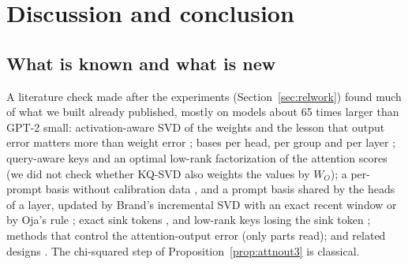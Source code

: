 \documentclass[10pt]{article}
\theoremstyle{plain}
\theoremstyle{definition}
\theoremstyle{remark}
\begin{document}

\section{Discussion and conclusion}
\label{sec:discussion}

\subsection{What is known and what is new}
\label{sec:novelty}

A literature check made after the experiments (Section~\ref{sec:relwork}) found much of what we built already published, mostly on models about 65 times larger than GPT-2 small: activation-aware SVD of the weights and the lesson that output error matters more than weight error \cite{wang2025svdllm,yuan2023asvd,hsu2022}; bases per head, per group and per layer \cite{palu2025}; query-aware keys \cite{attsvd2026,saki2026} and an optimal low-rank factorization of the attention scores \cite{kqsvd2025} (we did not check whether KQ-SVD also weights the values by $W_O$); a per-prompt basis without calibration data \cite{attsvd2026}, and a prompt basis shared by the heads of a layer, updated by Brand's incremental SVD with an exact recent window \cite{iskv2026} or by Oja's rule \cite{ojakv2025}; exact sink tokens \cite{xiao2024sinks,ojakv2025}, and low-rank keys losing the sink token \cite{saki2026}; methods that control the attention-output error \cite{readkv2026,anchorkv2026} (only parts read); and related designs \cite{saxena2024eigen,sun2024shadowkv,chang2025xkv,liu2024minicache,zhang2024lorc,ji2025mha2mla,meng2025transmla}. The chi-squared step of Proposition~\ref{prop:attnout3} is classical.
\end{document}
